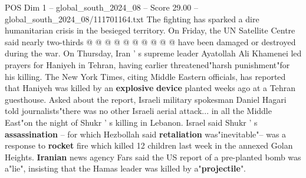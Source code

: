 \begin{textsample}{POS Dim 1 – global\_south\_2024\_08 – Score 29.00 – global\_south\_2024\_08/111701164.txt}
The fighting has sparked a dire humanitarian crisis in the besieged territory.
On Friday, the UN Satellite Centre said nearly two-thirds @ @ @ @ @ @ @ @ @ @ have been damaged or destroyed during the war.
On Thursday, Iran ' s supreme leader Ayatollah Ali Khamenei led prayers for Haniyeh in Tehran, having earlier threatened"harsh punishment"for his killing.
The New York Times, citing Middle Eastern officials, has reported that Haniyeh was killed by an \textbf{explosive} \textbf{device} planted weeks ago at a Tehran guesthouse.
Asked about the report, Israeli military spokesman Daniel Hagari told journalists"there was no other Israeli aerial attack... in all the Middle East"on the night of Shukr ' s killing in Lebanon.
Israel said Shukr ' s \textbf{assassination} -- for which Hezbollah said \textbf{retaliation} was"inevitable"-- was a response to \textbf{rocket} fire which killed 12 children last week in the annexed Golan Heights. \textbf{Iranian} news agency Fars said the US report of a pre-planted bomb was a"lie", insisting that the Hamas leader was killed by a"\textbf{projectile}".

\end{textsample}

